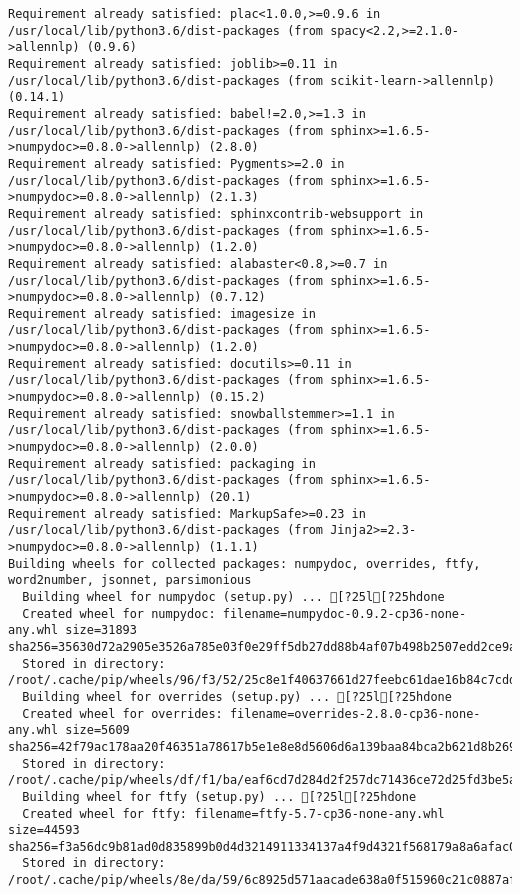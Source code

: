 \documentclass[
]{article}
\begin{document}
\begin{verbatim}
Requirement already satisfied: plac<1.0.0,>=0.9.6 in /usr/local/lib/python3.6/dist-packages (from spacy<2.2,>=2.1.0->allennlp) (0.9.6)
Requirement already satisfied: joblib>=0.11 in /usr/local/lib/python3.6/dist-packages (from scikit-learn->allennlp) (0.14.1)
Requirement already satisfied: babel!=2.0,>=1.3 in /usr/local/lib/python3.6/dist-packages (from sphinx>=1.6.5->numpydoc>=0.8.0->allennlp) (2.8.0)
Requirement already satisfied: Pygments>=2.0 in /usr/local/lib/python3.6/dist-packages (from sphinx>=1.6.5->numpydoc>=0.8.0->allennlp) (2.1.3)
Requirement already satisfied: sphinxcontrib-websupport in /usr/local/lib/python3.6/dist-packages (from sphinx>=1.6.5->numpydoc>=0.8.0->allennlp) (1.2.0)
Requirement already satisfied: alabaster<0.8,>=0.7 in /usr/local/lib/python3.6/dist-packages (from sphinx>=1.6.5->numpydoc>=0.8.0->allennlp) (0.7.12)
Requirement already satisfied: imagesize in /usr/local/lib/python3.6/dist-packages (from sphinx>=1.6.5->numpydoc>=0.8.0->allennlp) (1.2.0)
Requirement already satisfied: docutils>=0.11 in /usr/local/lib/python3.6/dist-packages (from sphinx>=1.6.5->numpydoc>=0.8.0->allennlp) (0.15.2)
Requirement already satisfied: snowballstemmer>=1.1 in /usr/local/lib/python3.6/dist-packages (from sphinx>=1.6.5->numpydoc>=0.8.0->allennlp) (2.0.0)
Requirement already satisfied: packaging in /usr/local/lib/python3.6/dist-packages (from sphinx>=1.6.5->numpydoc>=0.8.0->allennlp) (20.1)
Requirement already satisfied: MarkupSafe>=0.23 in /usr/local/lib/python3.6/dist-packages (from Jinja2>=2.3->numpydoc>=0.8.0->allennlp) (1.1.1)
Building wheels for collected packages: numpydoc, overrides, ftfy, word2number, jsonnet, parsimonious
  Building wheel for numpydoc (setup.py) ... [?25l[?25hdone
  Created wheel for numpydoc: filename=numpydoc-0.9.2-cp36-none-any.whl size=31893 sha256=35630d72a2905e3526a785e03f0e29ff5db27dd88b4af07b498b2507edd2ce9a
  Stored in directory: /root/.cache/pip/wheels/96/f3/52/25c8e1f40637661d27feebc61dae16b84c7cdd93b8bc3d7486
  Building wheel for overrides (setup.py) ... [?25l[?25hdone
  Created wheel for overrides: filename=overrides-2.8.0-cp36-none-any.whl size=5609 sha256=42f79ac178aa20f46351a78617b5e1e8e8d5606d6a139baa84bca2b621d8b269
  Stored in directory: /root/.cache/pip/wheels/df/f1/ba/eaf6cd7d284d2f257dc71436ce72d25fd3be5a5813a37794ab
  Building wheel for ftfy (setup.py) ... [?25l[?25hdone
  Created wheel for ftfy: filename=ftfy-5.7-cp36-none-any.whl size=44593 sha256=f3a56dc9b81ad0d835899b0d4d3214911334137a4f9d4321f568179a8a6afac0
  Stored in directory: /root/.cache/pip/wheels/8e/da/59/6c8925d571aacade638a0f515960c21c0887af1bfe31908fbf

\end{verbatim}
\end{document}
